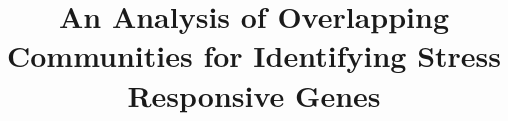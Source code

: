 \documentclass{bmcart}
\begin{document}
\begin{frontmatter}

\begin{fmbox}


\title{An Analysis of Overlapping Communities for
  Identifying Stress Responsive Genes}

\author[
  addressref={aff1},                        %
  corref={aff1},                            %
  email={camila.riccio@javerianacali.edu.co}   %
]{ }
\author[
  addressref={aff2},
  email={jfinke@javerianacali.edu.co}
]{ }
\author[
  addressref={aff2},
  email={camilo.rocha@javerianacali.edu.co}
]{ }

\address[id=aff1]{%
  ,  %
  ,               %
  ,                                              %
}

\address[id=aff2]{%
  ,  %
  ,               %
  ,                                              %
}


\end{fmbox}%

\begin{abstractbox}



\begin{keyword}
\end{keyword}

\end{abstractbox}

\end{frontmatter}












\begin{backmatter}

\end{backmatter}

%


\end{document}
